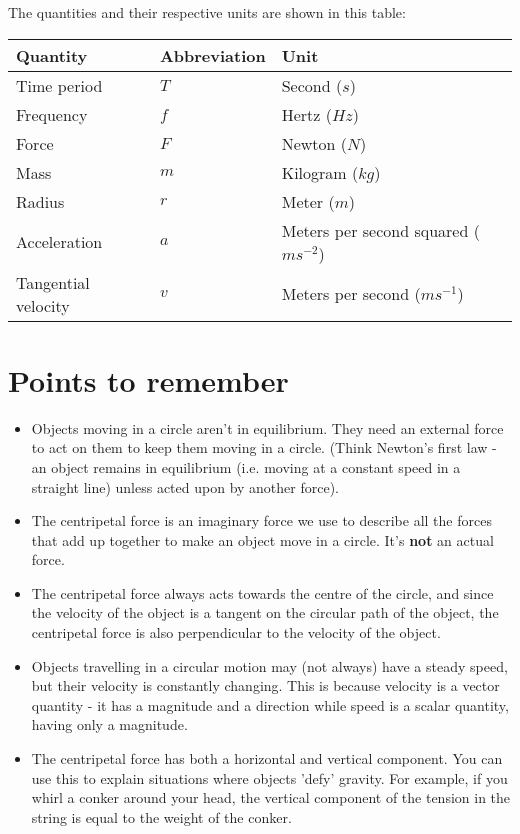 \documentclass{article}
\begin{document}
The quantities and their respective units are shown in this table:

\begin{center}
	\begin{tabular}{|l|l|l|}
		\hline
			Quantity & Abbreviation & Unit \\ \hline
			Time period & $T$ & Second ($s$) \\ \hline
			Frequency & $f$ & Hertz ($Hz$) \\ \hline
			Force & $F$ & Newton ($N$) \\ \hline
			Mass & $m$ & Kilogram ($kg$) \\ \hline
			Radius & $r$ & Meter ($m$) \\ \hline
			Acceleration & $a$ & Meters per second squared ($ms^{-2}$) \\ \hline
			Tangential velocity & $v$ & Meters per second ($ms^{-1}$) \\ \hline
	\end{tabular}
\end{center}


\section*{Points to remember}

\begin{itemize}
	\item Objects moving in a circle aren't in equilibrium. They need an external force to act on them to keep them moving in a circle. (Think Newton's first law - an object remains in equilibrium (i.e. moving at a constant speed in a straight line) unless acted upon by another force).
	\item The centripetal force is an imaginary force we use to describe all the forces that add up together to make an object move in a circle. It's \textbf{not} an actual force.
	\item The centripetal force always acts towards the centre of the circle, and since the velocity of the object is a tangent on the circular path of the object, the centripetal force is also perpendicular to the velocity of the object.
	\item Objects travelling in a circular motion may (not always) have a steady speed, but their velocity is constantly changing. This is because velocity is a vector quantity - it has a magnitude and a direction while speed is a scalar quantity, having only a magnitude.
	\item The centripetal force has both a horizontal and vertical component. You can use this to explain situations where objects 'defy' gravity. For example, if you whirl a conker around your head, the vertical component of the tension in the string is equal to the weight of the conker.
\end{itemize}
\end{document}
